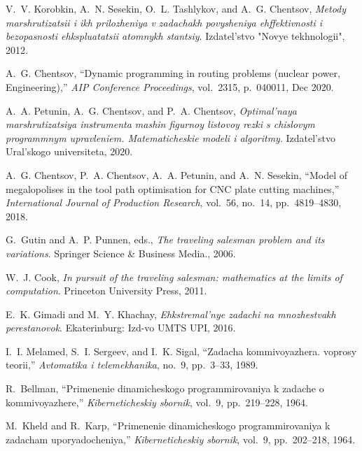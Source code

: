   \item
  V.~V. Korobkin, A.~N. Sesekin, O.~L. Tashlykov, and A.~G. Chentsov, {\em Metody
    marshrutizatsii i ikh prilozheniya v zadachakh povysheniya ehffektivnosti i
    bezopasnosti ehkspluatatsii atomnykh stantsiy}.
  \newblock Izdatel'stvo "Novye tekhnologii", 2012.

  \item
  A.~G. Chentsov, ``{Dynamic programming in routing problems (nuclear power,
    Engineering)},'' {\em AIP Conference Proceedings}, vol.~2315, p.~040011, Dec
    2020.

  \item
  A.~A. Petunin, A.~G. Chentsov, and P.~A. Chentsov, {\em Optimal'naya
    marshrutizatsiya instrumenta mashin figurnoy listovoy rezki s chislovym
    programmnym upravleniem. Matematicheskie modeli i algoritmy}.
  \newblock Izdatel'stvo Ural'skogo universiteta, 2020.

  \item
  A.~G. Chentsov, P.~A. Chentsov, A.~A. Petunin, and A.~N. Sesekin, ``Model of
    megalopolises in the tool path optimisation for {CNC} plate cutting
    machines,'' {\em International Journal of Production Research}, vol.~56,
    no.~14, pp.~4819--4830, 2018.

  \item
  G.~Gutin and A.~P. Punnen, eds., {\em The traveling salesman problem and its
    variations}.
  \newblock Springer Science \& Business Media., 2006.

  \item
  W.~J. Cook, {\em In pursuit of the traveling salesman: mathematics at the
    limits of computation}.
  \newblock Princeton University Press, 2011.

  \item
  E.~K. Gimadi and M.~Y. Khachay, {\em Ehkstremal'nye zadachi na mnozhestvakh
    perestanovok}.
  \newblock Ekaterinburg: Izd-vo UMTS UPI, 2016.

  \item
  I.~I. Melamed, S.~I. Sergeev, and I.~K. Sigal, ``Zadacha kommivoyazhera.
    voprosy teorii,'' {\em Avtomatika i telemekhanika}, no.~9, pp.~3--33, 1989.

  \item
  R.~Bellman, ``Primenenie dinamicheskogo programmirovaniya k zadache o
    kommivoyazhere,'' {\em Kiberneticheskiy sbornik}, vol.~9, pp.~219--228, 1964.

  \item
  M.~Kheld and R.~Karp, ``Primenenie dinamicheskogo programmirovaniya k zadacham
    uporyadocheniya,'' {\em Kiberneticheskiy sbornik}, vol.~9, pp.~202--218,
    1964.

